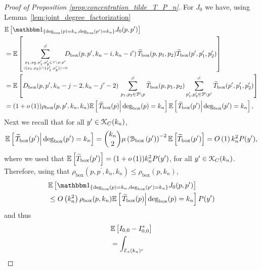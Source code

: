 \begin{proof}[Proof of Proposition \ref{prop:concentration_tilde_T_P_n}]
For $J_0$ we have, using Lemma~\ref{lem:joint_degree_factorization}
\begin{align*}
	&\Exp{\ind{\Dbox(p) = k_n, \Dbox(p^\prime) = k_n} J_0(p,p^\prime)}\\
	&= \Exp{\sum_{p_1, p_2, p_1^\prime, p_2^\prime \in \Pcal \setminus p,p^\prime 
		\atop |\{p_1, p_2\} \cap \{p_1^\prime, p_2^\prime\}| = 0}^{\ne}
		\hspace{-7pt} D_{\text{box}}(p,p^\prime, k_n-i,k_n- i^\prime) \,
		\widetilde{T}_{\text{box}}(p,p_1,p_2) \widetilde{T}_{\text{box}}(p^\prime, p_1^\prime, p_2^\prime)}\\
	&= \Exp{D_{\text{box}}(p,p^\prime, k_n-j-2,k_n- j^\prime-2) \, \sum_{p_1,p_2 \in \Pcal \setminus p}^{\ne} 
		\widetilde{T}_{\text{box}}(p,p_1,p_2)
		\sum_{p_1^\prime,p_2^\prime \in \Pcal \setminus p^\prime}^{\ne} 
			\widetilde{T}_{\text{box}}(p^\prime,p_1^\prime,p_2^\prime)}\\
	&= (1+\smallO{1})\rho_{\text{box}}(p,p^\prime,k_n,k_n) \CExp{\widetilde{T}_{\text{box}}(p)}{\Dbox(p) = k_n}
		\CExp{\widetilde{T}_{\text{box}}(p^\prime)}{\Dbox(p^\prime) = k_n},
\end{align*}
Next we recall that for all $y^\prime \in {\mathcal K}_{C}(k_n)$, 
\[
	\mathbb{E}\left[\left.\widetilde{T}_{\text{box}}(p^\prime)\right|\text{deg}_{\text{box}}(p^\prime) = k_n\right] = \binom{k_n}{2} \mu\left({\mathcal B}_{\text{box}}\left(p^\prime\right)\right)^{-2} \mathbb{E}\left[\widetilde{T}_{\text{box}}(p^\prime)\right] = O\left(1\right)k_n^2 P(y^\prime),
\] 
where we used that $\mathbb{E}\left[\widetilde{T}_{\text{box}}(p^\prime)\right] = (1+o\left(1\right)) k_n^2 P(y^\prime)$, for all $y^\prime \in {\mathcal K}_{C}(k_n)$. Therefore, using that $\rho_{\text{box}}(p,p^\prime,k_n,k_n) \le \rho_{\text{box}}(p,k_n)$,
\begin{align*}
	&\Exp{\ind{\Dbox(p) = k_n, \Dbox(p^\prime) = k_n} J_0(p,p^\prime)}\\
	&\le \bigO{k_n^2} \rho_{\text{box}}(p,k_n) \CExp{\widetilde{T}_{\text{box}}(p)}{\Dbox(p) = k_n} P(y^\prime)
\end{align*}
and thus
\begin{align*}
	&\Exp{I_{0,0} - I_{0,0}^\ast}\\
	&= \int_{\mathcal{E}_\varepsilon(k_n)^c}

\end{align*}
\end{proof}
